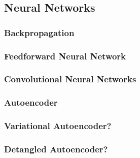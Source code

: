 \documentclass[../main]{subfiles}
\begin{document}
 \subsection{Neural Networks}
\subsubsection{Backpropagation}
\subsubsection{Feedforward Neural Network}
\subsubsection{Convolutional Neural Networks}
\subsubsection{Autoencoder}
\subsubsection{Variational Autoencoder?}
\subsubsection{Detangled Autoencoder?}
\end{document}
